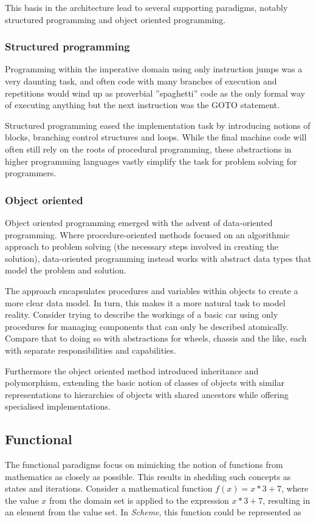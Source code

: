 This basis in the architecture lead to several supporting paradigms, notably structured programming and object oriented programming.

\subsubsection*{Structured programming}
Programming within the imperative domain using only instruction jumps was a very daunting task, and often code with many branches of execution and repetitions would wind up as proverbial ''spaghetti'' code as the only formal way of executing anything but the next instruction was the GOTO statement.

Structured programming eased the implementation task by introducing notions of blocks, branching control structures and loops. While the final machine code will often still rely on the roots of procedural programming, these abstractions in higher programming languages vastly simplify the task for problem solving for programmers.

\subsubsection*{Object oriented}
Object oriented programming emerged with the advent of data-oriented programming. Where procedure-oriented methods focused on an algorithmic approach to problem solving (the necessary steps involved in creating the solution), data-oriented programming instead works with abstract data types that model the problem and solution.

The approach encapsulates procedures and variables within objects to create a more clear data model. In turn, this makes it a more natural task to model reality. Consider trying to describe the workings of a basic car using only procedures for managing components that can only be described atomically. Compare that to doing so with abstractions for wheels, chassis and the like, each with separate responsibilities and capabilities.

Furthermore the object oriented method introduced inheritance and polymorphism, extending the basic notion of classes of objects with similar representations to hierarchies of objects with shared ancestors while offering specialised implementations.

\subsection{Functional}
The functional paradigms focus on mimicking the notion of functions from mathematics as closely as possible. This results in shedding such concepts as states and iterations. Consider a mathematical function $f(x) = x*3+7$, where the value $x$ from the domain set is applied to the expression $x*3+7$, resulting in an element from the value set. In \emph{Scheme}, this function could be represented as

